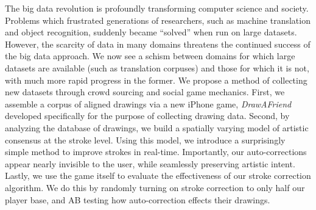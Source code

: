 The big data revolution is profoundly transforming computer science and society. Problems which frustrated generations of researchers, such as machine translation and object recognition, suddenly became ``solved'' when run on large datasets. However, the scarcity of data in many domains threatens the continued success of the big data approach. We now see a schism between domains for which large datasets are available (such as translation corpuses) and those for which it is not, with much more rapid progress in the former.  We propose a method of collecting new datasets through crowd sourcing and social game mechanics.  First, we assemble a corpus of aligned drawings via a new iPhone game, {\em DrawAFriend} developed specifically for the purpose of collecting drawing data. Second, by analyzing the database of drawings, we build a spatially varying model of artistic consensus at the stroke level. Using this model, we introduce a
surprisingly simple method to improve strokes in real-time. Importantly, our auto-corrections appear nearly invisible to the user, while seamlessly preserving artistic intent. Lastly, we use the game itself to evaluate the effectiveness of our stroke correction algorithm. We do this by randomly turning on stroke correction to only half our player base, and AB testing how auto-correction effects their drawings. 